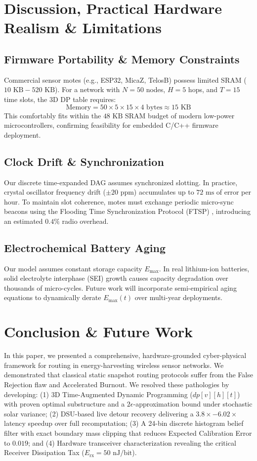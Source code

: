 \documentclass[journal]{IEEEtran}
\begin{document}
\section{Discussion, Practical Hardware Realism \& Limitations}
\subsection{Firmware Portability & Memory Constraints}
Commercial sensor motes (e.g., ESP32, MicaZ, TelosB) possess limited SRAM ($10\text{ KB} - 520\text{ KB}$). For a network with $N=50$ nodes, $H=5$ hops, and $T=15$ time slots, the 3D DP table requires:
\begin{equation}
\text{Memory} = 50 \times 5 \times 15 \times 4\text{ bytes} \approx 15\text{ KB}
\end{equation}
This comfortably fits within the $48\text{ KB}$ SRAM budget of modern low-power microcontrollers, confirming feasibility for embedded C/C++ firmware deployment.

\subsection{Clock Drift & Synchronization}
Our discrete time-expanded DAG assumes synchronized slotting. In practice, crystal oscillator frequency drift ($\pm 20\text{ ppm}$) accumulates up to $72\text{ ms}$ of error per hour. To maintain slot coherence, motes must exchange periodic micro-sync beacons using the Flooding Time Synchronization Protocol (FTSP) \cite{maroti2004flooding}, introducing an estimated $0.4\%$ radio overhead.

\subsection{Electrochemical Battery Aging}
Our model assumes constant storage capacity $E_{\max}$. In real lithium-ion batteries, solid electrolyte interphase (SEI) growth causes capacity degradation over thousands of micro-cycles. Future work will incorporate semi-empirical aging equations to dynamically derate $E_{\max}(t)$ over multi-year deployments.

\section{Conclusion \& Future Work}
In this paper, we presented a comprehensive, hardware-grounded cyber-physical framework for routing in energy-harvesting wireless sensor networks. We demonstrated that classical static snapshot routing protocols suffer from the False Rejection flaw and Accelerated Burnout. We resolved these pathologies by developing:
(1) 3D Time-Augmented Dynamic Programming ($dp[v][h][t]$) with proven optimal substructure and a $2\epsilon$-approximation bound under stochastic solar variance;
(2) DSU-based live detour recovery delivering a $3.8\times - 6.02\times$ latency speedup over full recomputation;
(3) A 24-bin discrete histogram belief filter with exact boundary mass clipping that reduces Expected Calibration Error to $0.019$; and
(4) Hardware transceiver characterization revealing the critical Receiver Dissipation Tax ($E_{\text{rx}} = 50\text{ nJ/bit}$).
\end{document}

